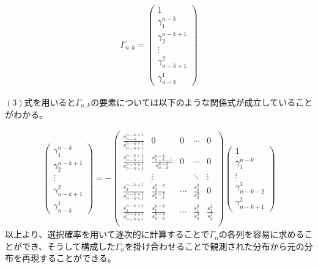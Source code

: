 \documentclass{jsarticle}
\begin{document}
\begin{align}
	\Gamma_{n, k} =
	\begin{pmatrix}
		1\\[8pt]
		\gamma_1^{n-k}\\[8pt]
		\gamma_2^{n-k+1}\\[8pt]
		\vdots\\[8pt]
		\gamma_{n-k+1}^2\\[8pt]
		\gamma_{n-k}^1
	\end{pmatrix}
\end{align}

$(3)$式を用いると$\Gamma_{n,k}$の要素については以下のような関係式が成立していることがわかる。

\begin{align}
	\begin{pmatrix}
		\gamma_1^{n-k}\\[8pt]
		\gamma_2^{n-k+1}\\[8pt]
		\vdots\\[8pt]
		\gamma_{n-k+1}^2\\[8pt]
		\gamma_{n-k}^1
	\end{pmatrix} = -
	\begin{pmatrix}
		\frac{s_{n-k}^{n-k+1}}{s_{n-k+1}^{n-k+1}} & 0 &0 &\cdots & 0\\[8pt]
		\frac{s_{n-k-1}^{n-k+1}}{s_{n-k+1}^{n-k+1}} & \frac{s_{n-k-1}^{n-k}}{s_{n-k}^{n-k}} & 0& \cdots & 0\\[8pt]
		 &\vdots && \ddots & \vdots\\[8pt]
		\frac{s_{2}^{n-k+1}}{s_{n-k+1}^{n-k+1}} & \frac{s_{2}^{n-k}}{s_{n-k}^{n-k}} & \cdots & \frac{s_2^3}{s_3^3} & 0\\[8pt]
		\frac{s_{1}^{n-k+1}}{s_{n-k+1}^{n-k+1}} & \frac{s_{1}^{n-k}}{s_{n-k}^{n-k}} & \cdots & \frac{s_1^3}{s_3^3} & \frac{s_1^2}{s_2^2}\\[8pt]
	\end{pmatrix}
	\begin{pmatrix}
		1\\[8pt]
		\gamma_1^{n-k}\\[8pt]
		\vdots\\[8pt]
		\gamma_{n-k-2}^{3}\\[8pt]
		\gamma_{n-k+1}^2
	\end{pmatrix}
\end{align}
以上より、選択確率を用いて逐次的に計算することで$\Gamma_n$の各列を容易に求めることができ、そうして構成した$\Gamma_n$を掛け合わせることで観測された分布から元の分布を再現することができる。
\end{document}
